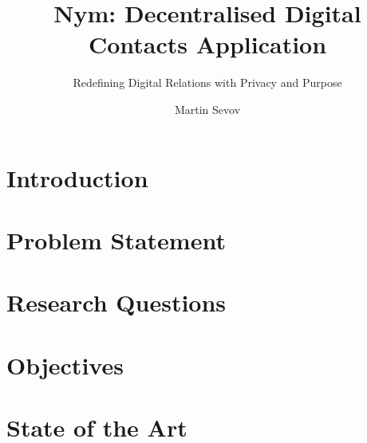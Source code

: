 \documentclass{imc-inf}
\title{Nym: Decentralised Digital Contacts Application}
\subtitle{ Redefining Digital Relations with Privacy and Purpose}
\author{Martin Sevov}
\begin{document}
\frontmatter\maketitle%
\begin{declarations}\end{declarations}%
%
\tableofcontents%
\clearpage

%
\listoftables
\clearpage

%
\listoffigures
\clearpage


\mainmatter%

\begin{abstract}
\end{abstract}

\chapter{Introduction}



\chapter{Problem Statement}



\chapter{Research Questions}



\chapter{Objectives}



\chapter{State of the Art}
\end{document}
